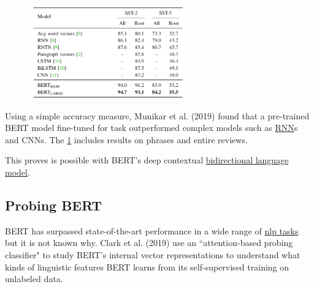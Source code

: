 \begin{program}
\begin{figure}
    \begin{center}
    \vspace{-10pt}
    \includegraphics[width=0.6\textwidth]{imgs/table_bert_vsOtherModels.png}
    \end{center}
\vspace{-30pt}
\label{tbl:bertExperimentResults}
\end{figure}


Using a simple accuracy measure, Munikar et al. (2019) found that a pre-trained BERT model fine-tuned for  task outperformed complex models such as \hyperref[sec:RNN]{RNN}s and CNNs. The \cref{tbl:bertExperimentResults} includes results on phrases and entire reviews. 


This proves  is possible with BERT's deep contextual \hyperref[sec:BidirectionalLM]{bidirectional language model}.
\end{program}


\subsection{Probing BERT} \label{sec:ProbingBERT}

BERT has surpassed state-of-the-art performance in a wide range of \hyperref[app:Appendix_NLPTasks]{nlp tasks} but it is not known why. Clark et al. (2019) use an ``attention-based probing classifier" to study BERT's internal vector representations to understand what kinds of linguistic features BERT learns from its self-supervised training on unlabeled data. 



